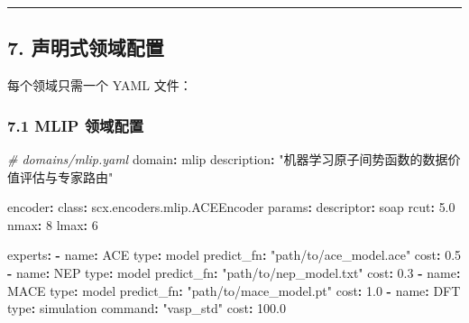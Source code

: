 \documentclass[
  12pt,
]{ctexart}
\newenvironment{Shaded}{}{}
\newcommand{\AttributeTok}[1]{\textcolor[rgb]{0.49,0.56,0.16}{#1}}
\newcommand{\CommentTok}[1]{\textcolor[rgb]{0.38,0.63,0.69}{\textit{#1}}}
\newcommand{\DecValTok}[1]{\textcolor[rgb]{0.25,0.63,0.44}{#1}}
\newcommand{\FloatTok}[1]{\textcolor[rgb]{0.25,0.63,0.44}{#1}}
\newcommand{\FunctionTok}[1]{\textcolor[rgb]{0.02,0.16,0.49}{#1}}
\newcommand{\KeywordTok}[1]{\textcolor[rgb]{0.00,0.44,0.13}{\textbf{#1}}}
\newcommand{\StringTok}[1]{\textcolor[rgb]{0.25,0.44,0.63}{#1}}
\begin{document}
\begin{center}\rule{0.5\linewidth}{0.5pt}\end{center}

\subsection{7.
声明式领域配置}\label{ux58f0ux660eux5f0fux9886ux57dfux914dux7f6e}

每个领域只需一个 YAML 文件：

\subsubsection{7.1 MLIP 领域配置}\label{mlip-ux9886ux57dfux914dux7f6e}

\begin{Shaded}
\begin{Highlighting}[]
\CommentTok{\# domains/mlip.yaml}
\FunctionTok{domain}\KeywordTok{:}\AttributeTok{ mlip}
\FunctionTok{description}\KeywordTok{:}\AttributeTok{ }\StringTok{"机器学习原子间势函数的数据价值评估与专家路由"}

\FunctionTok{encoder}\KeywordTok{:}
\AttributeTok{  }\FunctionTok{class}\KeywordTok{:}\AttributeTok{ scx.encoders.mlip.ACEEncoder}
\AttributeTok{  }\FunctionTok{params}\KeywordTok{:}
\AttributeTok{    }\FunctionTok{descriptor}\KeywordTok{:}\AttributeTok{ soap}
\AttributeTok{    }\FunctionTok{rcut}\KeywordTok{:}\AttributeTok{ }\FloatTok{5.0}
\AttributeTok{    }\FunctionTok{nmax}\KeywordTok{:}\AttributeTok{ }\DecValTok{8}
\AttributeTok{    }\FunctionTok{lmax}\KeywordTok{:}\AttributeTok{ }\DecValTok{6}

\FunctionTok{experts}\KeywordTok{:}
\AttributeTok{  }\KeywordTok{{-}}\AttributeTok{ }\FunctionTok{name}\KeywordTok{:}\AttributeTok{ ACE}
\AttributeTok{    }\FunctionTok{type}\KeywordTok{:}\AttributeTok{ model}
\AttributeTok{    }\FunctionTok{predict\_fn}\KeywordTok{:}\AttributeTok{ }\StringTok{"path/to/ace\_model.ace"}
\AttributeTok{    }\FunctionTok{cost}\KeywordTok{:}\AttributeTok{ }\FloatTok{0.5}
\AttributeTok{  }\KeywordTok{{-}}\AttributeTok{ }\FunctionTok{name}\KeywordTok{:}\AttributeTok{ NEP}
\AttributeTok{    }\FunctionTok{type}\KeywordTok{:}\AttributeTok{ model}
\AttributeTok{    }\FunctionTok{predict\_fn}\KeywordTok{:}\AttributeTok{ }\StringTok{"path/to/nep\_model.txt"}
\AttributeTok{    }\FunctionTok{cost}\KeywordTok{:}\AttributeTok{ }\FloatTok{0.3}
\AttributeTok{  }\KeywordTok{{-}}\AttributeTok{ }\FunctionTok{name}\KeywordTok{:}\AttributeTok{ MACE}
\AttributeTok{    }\FunctionTok{type}\KeywordTok{:}\AttributeTok{ model}
\AttributeTok{    }\FunctionTok{predict\_fn}\KeywordTok{:}\AttributeTok{ }\StringTok{"path/to/mace\_model.pt"}
\AttributeTok{    }\FunctionTok{cost}\KeywordTok{:}\AttributeTok{ }\FloatTok{1.0}
\AttributeTok{  }\KeywordTok{{-}}\AttributeTok{ }\FunctionTok{name}\KeywordTok{:}\AttributeTok{ DFT}
\AttributeTok{    }\FunctionTok{type}\KeywordTok{:}\AttributeTok{ simulation}
\AttributeTok{    }\FunctionTok{command}\KeywordTok{:}\AttributeTok{ }\StringTok{"vasp\_std"}
\AttributeTok{    }\FunctionTok{cost}\KeywordTok{:}\AttributeTok{ }\FloatTok{100.0}


\end{Highlighting}
\end{Shaded}
\end{document}
